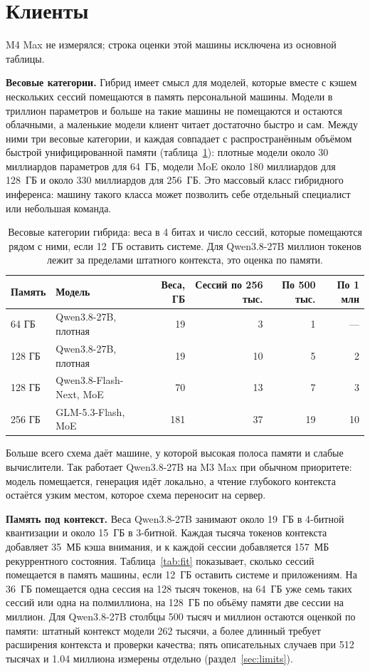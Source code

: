\section{Клиенты}
\label{sec:clients}

M4 Max не измерялся; строка оценки этой машины исключена из основной таблицы.

\textbf{Весовые категории.} Гибрид имеет смысл для моделей, которые вместе с кэшем нескольких сессий помещаются в
память персональной машины. Модели в триллион параметров и больше на такие машины не помещаются и остаются
облачными, а маленькие модели клиент читает достаточно быстро и сам. Между ними три весовые категории, и каждая
совпадает с распространённым объёмом быстрой унифицированной памяти (таблица~\ref{tab:tiers}): плотные модели около
30 миллиардов параметров для 64~ГБ, модели MoE около 180 миллиардов для 128~ГБ и около 330 миллиардов для 256~ГБ. Это
массовый класс гибридного инференса: машину такого класса может позволить себе отдельный специалист или небольшая
команда.

\begin{table}[t]
\centering
\caption{Весовые категории гибрида: веса в 4 битах и число сессий, которые помещаются рядом с ними, если 12~ГБ
оставить системе. Для Qwen3.8-27B миллион токенов лежит за пределами штатного контекста, это оценка по памяти.}
\label{tab:tiers}
\footnotesize
\begin{tabular}{llrrrr}
\toprule
Память & Модель & Веса, ГБ & Сессий по 256 тыс. & По 500 тыс. & По 1 млн \\
\midrule
64 ГБ & Qwen3.8-27B, плотная & 19 & 3 & 1 & --- \\
128 ГБ & Qwen3.8-27B, плотная & 19 & 10 & 5 & 2 \\
128 ГБ & Qwen3.8-Flash-Next, MoE & 70 & 13 & 7 & 3 \\
256 ГБ & GLM-5.3-Flash, MoE & 181 & 37 & 19 & 10 \\
\bottomrule
\end{tabular}
\end{table}

Больше всего схема даёт машине, у которой высокая полоса памяти и слабые вычислители. Так работает Qwen3.8-27B на M3 Max
при обычном приоритете: модель помещается, генерация идёт локально, а чтение глубокого контекста остаётся узким
местом, которое схема переносит на сервер.

\textbf{Память под контекст.} Веса Qwen3.8-27B занимают около 19~ГБ в 4-битной квантизации и около 15~ГБ в 3-битной.
Каждая тысяча токенов контекста добавляет 35~МБ кэша внимания, и к каждой сессии добавляется 157~МБ рекуррентного
состояния. Таблица~\ref{tab:fit} показывает, сколько сессий помещается в память машины, если 12~ГБ оставить
системе и приложениям. На 36~ГБ помещается одна сессия на 128 тысяч токенов, на 64~ГБ уже семь таких сессий или одна на
полмиллиона, на 128~ГБ по объёму памяти две сессии на миллион. Для Qwen3.8-27B столбцы 500 тысяч и миллион
остаются оценкой по памяти: штатный контекст модели 262 тысячи, а более длинный требует расширения контекста и
проверки качества; пять описательных случаев при 512 тысячах и 1.04 миллиона измерены отдельно (раздел~\ref{sec:limits}).

